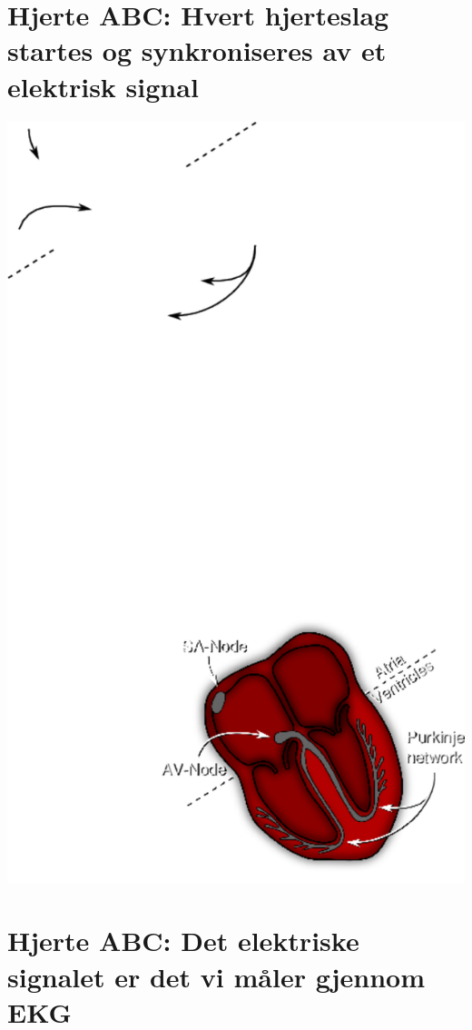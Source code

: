 \documentclass[%
oneside,                 %
final,                   %
10pt]{article}
\begin{document}
\noindent

\section{Hjerte ABC: Hvert hjerteslag startes og synkroniseres av et elektrisk signal}



\centerline{\includegraphics[width=0.9\linewidth]{fig/heart_scetch.pdf}}




\section{Hjerte ABC: Det elektriske signalet er det vi måler gjennom EKG}
\end{document}
